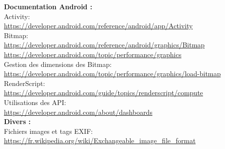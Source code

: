 \documentclass[12pt, a4paper]{article}
\begin{document}
  \textbf{Documentation Android :}
  \\
  Activity:
  \\
  \url{https://developer.android.com/reference/android/app/Activity}
  \\
  Bitmap:
  \\
  \url{https://developer.android.com/reference/android/graphics/Bitmap}
  \url{https://developer.android.com/topic/performance/graphics}
  \\
  Gestion des dimensions des Bitmap:
  \\
  \url{https://developer.android.com/topic/performance/graphics/load-bitmap}
  \\
  RenderScript:
  \\
  \url{https://developer.android.com/guide/topics/renderscript/compute}
  \\
  Utilisations des API:
  \\
  \url{https://developer.android.com/about/dashboards}
  \\


  \textbf{Divers :}
  \\
  Fichiers images et tags EXIF:
  \\
  \url{https://fr.wikipedia.org/wiki/Exchangeable_image_file_format}
\end{document}
